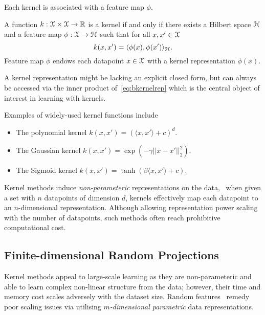Each kernel is associated with a feature map $\phi$.
\begin{ndefn} \label{def:bkernelrepr}
	 A function $k: \mathcal{X} \times \mathcal{X} \rightarrow \mathbb{R}$ is a kernel if and only if there exists a Hilbert space $\mathcal{H}$ and a feature map $\phi: \mathcal{X} \rightarrow \mathcal{H}$ such that for all $x, x' \in \mathcal{X}$
	 \[
	 \label{eq:bkernelrep}
	 k(x,x') = \langle \phi(x), \phi(x') \rangle_{\mathcal{H}}.
	 \]
	 Feature map $\phi$ endows each datapoint $x \in \mathcal{X}$ with a kernel representation $\phi(x)$.
\end{ndefn}

A kernel representation might be lacking an explicit closed form, but can always be accessed via the inner product of~\cref{eq:bkernelrep} which is the central object of interest in learning with kernels.

Examples of widely-used kernel functions include
\begin{itemize}
	\item The polynomial kernel $k(x,x') = \left(\langle x, x'\rangle + c\right)^d$.
	\item The Gaussian kernel $k(x,x') = \exp(-\gamma||x-x'||_{2}^2)$.
	\item The Sigmoid kernel $k(x,x') = \tanh(\beta\langle x, x'\rangle + c)$.
\end{itemize}

Kernel methods induce \emph{non-parameteric} representations on the data, \ie~when given a set with $ n $ datapoints of dimension $d$, kernels effectively map each datapoint to an $n$-dimensional representation. Although allowing representation power scaling with the number of datapoints, such methods often reach prohibitive computational cost.

\subsection{Finite-dimensional Random Projections}
\label{subsec:b-random-features}

Kernel methods appeal to large-scale learning as they are non-parameteric and able to learn complex non-linear structure from the data; however, their time and memory cost scales adversely with the dataset size. Random features~\citep{rahimi08} remedy poor scaling issues via utilising \emph{$m$-dimensional parametric} data representations.









